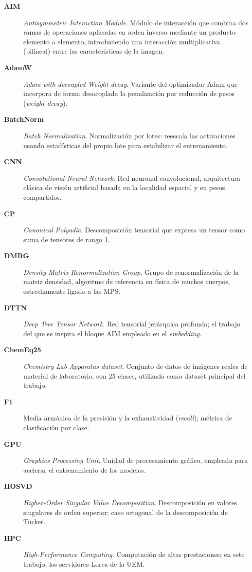 \begin{description}
  \item[\textbf{AIM}] \textit{Antisymmetric Interaction Module}. Módulo de interacción que combina dos ramas de operaciones aplicadas en orden inverso mediante un producto elemento a elemento, introduciendo una interacción multiplicativa (bilineal) entre las características de la imagen.
  \item[\textbf{AdamW}] \textit{Adam with decoupled Weight decay}. Variante del optimizador Adam que incorpora de forma desacoplada la penalización por reducción de pesos (\textit{weight decay}).
  \item[\textbf{BatchNorm}] \textit{Batch Normalization}. Normalización por lotes: reescala las activaciones usando estadísticas del propio lote para estabilizar el entrenamiento.
  \item[\textbf{CNN}] \textit{Convolutional Neural Network}. Red neuronal convolucional, arquitectura clásica de visión artificial basada en la localidad espacial y en pesos compartidos.
  \item[\textbf{CP}] \textit{Canonical Polyadic}. Descomposición tensorial que expresa un tensor como suma de tensores de rango 1.
  \item[\textbf{DMRG}] \textit{Density Matrix Renormalization Group}. Grupo de renormalización de la matriz densidad, algoritmo de referencia en física de muchos cuerpos, estrechamente ligado a las MPS.
  \item[\textbf{DTTN}] \textit{Deep Tree Tensor Network}. Red tensorial jerárquica profunda; el trabajo del que se inspira el bloque AIM empleado en el \textit{embedding}.
  \item[\textbf{ChemEq25}] \textit{Chemistry Lab Apparatus dataset}. Conjunto de datos de imágenes reales de material de laboratorio, con 25 clases, utilizado como dataset principal del trabajo.
  \item[\textbf{F1}] Media armónica de la precisión y la exhaustividad (\textit{recall}); métrica de clasificación por clase.
  \item[\textbf{GPU}] \textit{Graphics Processing Unit}. Unidad de procesamiento gráfico, empleada para acelerar el entrenamiento de los modelos.
  \item[\textbf{HOSVD}] \textit{Higher-Order Singular Value Decomposition}. Descomposición en valores singulares de orden superior; caso ortogonal de la descomposición de Tucker.
  \item[\textbf{HPC}] \textit{High-Performance Computing}. Computación de altas prestaciones; en este trabajo, los servidores Lorca de la UEM.

\end{description}
